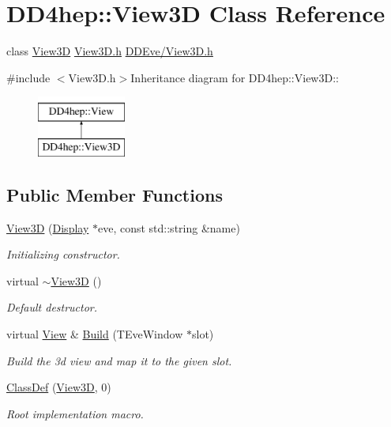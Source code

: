 \hypertarget{class_d_d4hep_1_1_view3_d}{
\section{DD4hep::View3D Class Reference}
\label{class_d_d4hep_1_1_view3_d}
}


class \hyperlink{class_d_d4hep_1_1_view3_d}{View3D} \hyperlink{_view3_d_8h}{View3D.h} \hyperlink{_view3_d_8h}{DDEve/View3D.h}  


{\ttfamily \#include $<$View3D.h$>$}Inheritance diagram for DD4hep::View3D::\begin{figure}[H]
\begin{center}
\leavevmode
\includegraphics[height=2cm]{class_d_d4hep_1_1_view3_d}
\end{center}
\end{figure}
\subsection*{Public Member Functions}
\begin{DoxyCompactItemize}
\item 
\hyperlink{class_d_d4hep_1_1_view3_d_aec5a272c7c13401f3c40cf51170b9ace}{View3D} (\hyperlink{class_d_d4hep_1_1_display}{Display} $\ast$eve, const std::string \&name)
\begin{DoxyCompactList}\small\item\em Initializing constructor. \item\end{DoxyCompactList}\item 
virtual \hyperlink{class_d_d4hep_1_1_view3_d_a54e79a96844ebb7e5337622cf65188aa}{$\sim$View3D} ()
\begin{DoxyCompactList}\small\item\em Default destructor. \item\end{DoxyCompactList}\item 
virtual \hyperlink{class_d_d4hep_1_1_view}{View} \& \hyperlink{class_d_d4hep_1_1_view3_d_a8067ea1bbbbcf503e271acd7dcace79f}{Build} (TEveWindow $\ast$slot)
\begin{DoxyCompactList}\small\item\em Build the 3d view and map it to the given slot. \item\end{DoxyCompactList}\item 
\hyperlink{class_d_d4hep_1_1_view3_d_af7a20e27b1a1a86cd76af61d17167172}{ClassDef} (\hyperlink{class_d_d4hep_1_1_view3_d}{View3D}, 0)
\begin{DoxyCompactList}\small\item\em Root implementation macro. \item\end{DoxyCompactList}\end{DoxyCompactItemize}


